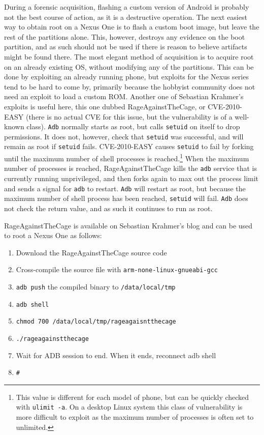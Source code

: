 During a forensic acquisition, flashing a custom version of Android is probably not the best course of action, as it is a
destructive operation.  The next easiest way to obtain root on a Nexus One is to flash a custom boot image, but leave the rest of
the partitions alone.  This, however, destroys any evidence on the boot partition, and as such should not be used if there is reason
to believe artifacts might be found there.  The most elegant method of acquisition is to acquire root on an already existing OS,
without modifying any of the partitions.  This can be done by exploiting an already running phone, but exploits for the Nexus series
tend to be hard to come by, primarily because the hobbyist community does not need an exploit to load a custom ROM.  Another one of
Sebastian Krahmer's exploits is useful here, this one dubbed RageAgainstTheCage, or CVE-2010-EASY (there is no actual CVE for this
issue, but the vulnerability is of a well-known class).  \texttt{Adb} normally starts as root, but calls \texttt{setuid} on itself
to drop permissions.  It does not, however, check that \texttt{setuid} was successful, and will remain as root if \texttt{setuid}
fails.  CVE-2010-EASY causes \texttt{setuid} to fail by forking until the maximum number of shell processes is
reached.\footnote{This value is different for each model of phone, but can be quickly checked with \texttt{ulimit -a}.  On a desktop
Linux system this class of vulnerability is more difficult to exploit as the maximum number of processes is often set to unlimited.}
When the maximum number of processes is reached, RageAgainstTheCage kills the \texttt{adb} service that is currently running
unprivileged, and then forks again to max out the process limit and sends a signal for \texttt{adb} to restart.  \texttt{Adb} will
restart as root, but because the maximum number of shell process has been reached, \texttt{setuid} will fail.  \texttt{Adb} does not
check the return value, and as such it continues to run as root.

RageAgainstTheCage is available on Sebastian Krahmer's blog and can be used to root a Nexus One as follows:
\begin{enumerate}
	\item Download the RageAgainstTheCage source code
	\item Cross-compile the source file with \texttt{arm-none-linux-gnueabi-gcc}
	\item \texttt{adb push} the compiled binary to \texttt{/data/local/tmp}
	\item \texttt{adb shell}
	\item \texttt{chmod 700 /data/local/tmp/rageagaisntthecage}
	\item \texttt{./rageagainstthecage}
	\item Wait for ADB session to end. When it ends, reconnect adb shell
	\item \texttt{\#}
\end{enumerate}	

